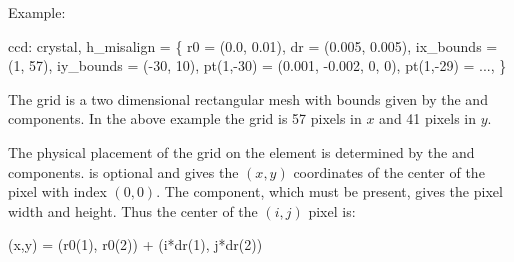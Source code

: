 Example:
\begin{example}
  ccd: crystal, h_misalign = \{
            r0 = (0.0, 0.01), dr = (0.005, 0.005),
            ix_bounds = (1, 57), iy_bounds = (-30, 10),
            pt(1,-30) = (0.001, -0.002, 0, 0), 
            pt(1,-29) = ..., 
          \}
\end{example}

The grid is a two dimensional rectangular mesh with bounds given by the  and
 components. In the above example the grid is 57 pixels in $x$ and 41 pixels in $y$.

The physical placement of the grid on the element is determined by the  and 
components.  is optional and gives the $(x,y)$ coordinates of the center of the pixel with
index $(0,0)$. The  component, which must be present, gives the pixel width and height. Thus
the center of the $(i,j)$ pixel is:
\begin{example}
  (x,y) = (r0(1), r0(2)) + (i*dr(1), j*dr(2))
\end{example}

